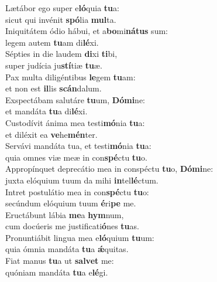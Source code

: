 \evenverse Lætábor ego super e\textbf{ló}quia \textbf{tu}a:~\*\\
\evenverse sicut qui invénit \textbf{spó}lia \textbf{mul}ta.\\
\oddverse Iniquitátem ódio hábui, et a\textbf{bo}mi\textbf{ná}\textbf{tus} sum:~\*\\
\oddverse legem autem \textbf{tu}am di\textbf{lé}xi.\\
\evenverse Sépties in die laudem \textbf{di}xi \textbf{ti}bi,~\*\\
\evenverse super judícia ju\textbf{stí}tiæ \textbf{tu}æ.\\
\oddverse Pax multa diligéntibus \textbf{le}gem \textbf{tu}am:~\*\\
\oddverse et non est \textbf{il}lis \textbf{scán}dalum.\\
\evenverse Exspectábam salutáre \textbf{tu}um, \textbf{Dó}\textbf{mi}ne:~\*\\
\evenverse et mandáta \textbf{tu}a di\textbf{lé}xi.\\
\oddverse Custodívit ánima mea testi\textbf{mó}nia \textbf{tu}a:~\*\\
\oddverse et diléxit ea \textbf{ve}he\textbf{mén}ter.\\
\evenverse Servávi mandáta tua, et testi\textbf{mó}nia \textbf{tu}a:~\*\\
\evenverse quia omnes viæ meæ in con\textbf{spé}ctu \textbf{tu}o.\\
\oddverse Appropínquet deprecátio mea in conspéctu \textbf{tu}o, \textbf{Dó}\textbf{mi}ne:~\*\\
\oddverse juxta elóquium tuum da mihi \textbf{in}tel\textbf{lé}ctum.\\
\evenverse Intret postulátio mea in con\textbf{spé}ctu \textbf{tu}o:~\*\\
\evenverse secúndum elóquium tuum \textbf{é}ri\textbf{pe} me.\\
\oddverse Eructábunt lábia \textbf{me}a \textbf{hym}num,~\*\\
\oddverse cum docúeris me justificati\textbf{ó}nes \textbf{tu}as.\\
\evenverse Pronuntiábit lingua mea e\textbf{ló}quium \textbf{tu}um:~\*\\
\evenverse quia ómnia mandáta \textbf{tu}a \textbf{ǽ}quitas.\\
\oddverse Fiat manus \textbf{tu}a ut \textbf{sal}\textbf{vet} me:~\*\\
\oddverse quóniam mandáta \textbf{tu}a e\textbf{lé}gi.\\

